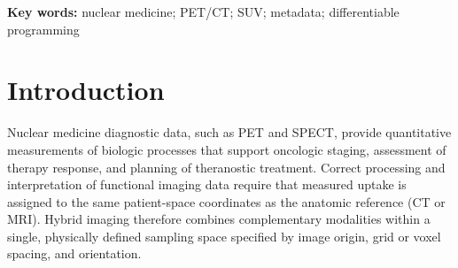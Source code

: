 \documentclass[a4paper,10pt,preprint]{elsarticle}
\begin{document}
\begin{frontmatter}
\begin{abstract}
\textbf{Results:} \texttt{MedImages.jl} achieved a \(7.2\times\) turnaround speedup over the MONAI caching pipeline in the 100-subject benchmark and, for isolated spatial operations, MedImages.jl GPU outperformed MedImages.jl CPU by \(115\times\), \(71\times\), and \(135\times\) for resampling, orientation changes, and fused affine transforms, in that order. The MedImages.jl CPU additionally outperformed the SimpleITK CPU by \(17\times\), \(31\times\) and \(8.1\times\) in spatial preprocessing operations, respectively. SUV\textsubscript{bw} matched SimpleITK to approximately \(10^{-14}\) precision, and the end-to-end transformation chain preserved liver-mask-based quantitative readouts across the 10-patient cohort, with a mean SUV deviation of \(0.17\%\) (range: \(0.00\%\)--\(0.40\%\)) and a liver volume deviation of \(0.10\%\) (range: \(0.01\%\)--\(0.28\%\)), consistent with interpolation effects rather than metadata deterioration. Learned spatial transforms reduced reconstruction error by \(>65\%\), and UDE dosimetry refinement converged to an MSE of \(4.14\times10^{-4}\) versus sMC ground-truth dose maps (DM), achieving the best overall performance among the evaluated NN.

\textbf{Conclusion:} \texttt{MedImages.jl} provides a unified, GPU-accelerated, metadata-aware, and differentiable foundation that addresses scalability, speed, differentiability, and metadata integrity for quantitative nuclear medicine preprocessing and AI/SciML workflows.

\end{abstract}

\end{frontmatter}

\textbf{Key words:} nuclear medicine; PET/CT; SUV; metadata; differentiable programming

\section{Introduction}

Nuclear medicine diagnostic data, such as PET and SPECT, provide quantitative measurements of biologic processes that support oncologic staging, assessment of therapy response, and planning of theranostic treatment. Correct processing and interpretation of functional imaging data require that measured uptake is assigned to the same patient-space coordinates as the anatomic reference (CT or MRI). Hybrid imaging therefore combines complementary modalities within a single, physically defined sampling space specified by image origin, grid or voxel spacing, and orientation. 
\end{document}
